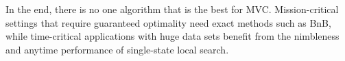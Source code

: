 \documentclass[sigconf]{acmart}
\begin{document}
In the end, there is no one algorithm that is the best for MVC. Mission-critical settings that require guaranteed optimality need exact methods such as BnB, while time-critical applications with huge data sets benefit from the nimbleness and anytime performance of single-state local search.



\end{document}
